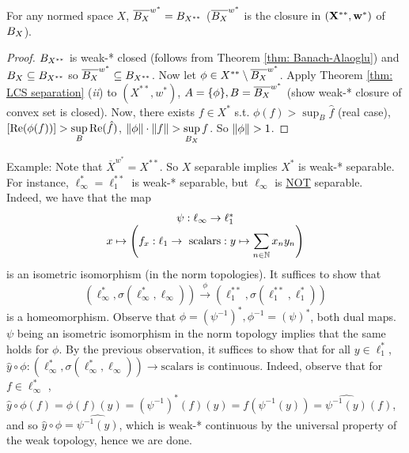 \documentclass{article}
\begin{document}
 \begin{theorem}[Goldstine]\label{thm: Goldstine}
     For any normed space $X$, $\overline{B_{X}}^{w^*}=B_{X^{**}}$ ($\overline{B_{X}}^{w^*}$ is the closure in $(\mathbf{X^{**}, w^*})$ of $B_{X}$).
 \end{theorem}

 \begin{proof}
     $B_{X^{**}}$ is weak-* closed (follows from Theorem \ref{thm: Banach-Alaoglu}) and $B_{X}\subseteq B_{X^{**}}$ so $\overline{B_{X}}^{w^*}\subseteq B_{X^{**}}$. Now let $\phi \in X^{**}\setminus \overline{B_{X}}^{w^*}$. Apply Theorem \ref{thm: LCS separation} (\textit{ii}) to $(X^{**}, w^*)$, $A=\{\phi\}, B = \overline{B_{X}}^{w^*}$ (show weak-* closure of convex set is closed). Now, there exists $f\in X^*$ s.t. $\phi(f)>\displaystyle\sup_B \hat{f}$ (real case), $[\operatorname{Re}(\phi(f))]>\displaystyle\sup_B \operatorname{Re}(\hat{f})$, $\left\lVert\phi\right\rVert\cdot\left\lVert f\right\rVert>\displaystyle\sup_{B_{X}} f$. So $\left\lVert\phi\right\rVert>1$.
 \end{proof}

\begin{examplesblock}{Example:}\label{examples: 10}
    Note that $\overline{X}^{w^*}=X^{**}$. So $X$ separable implies $X^*$ is weak-* separable. For instance, $\ell_\infty^* = \ell_1^{**}$ is weak-* separable, but $\ell_\infty$ is \noindent\underline{NOT} separable.\\

    Indeed, we have that the map 
    $$
    \begin{array}{cc}
         \psi: \ell_\infty\to \ell_1^* \\
          x\mapsto \left(f_x:\ell_1\to \text{ scalars}: y\mapsto \displaystyle\sum_{n\in\mathbb{N}}x_ny_n\right)
    \end{array}
    $$
    is an isometric isomorphism (in the norm topologies). It suffices to show that 
    $$
    (\ell_\infty^*, \sigma(\ell_\infty^*, \ell_\infty))\xrightarrow{\phi}(\ell_1^{**}, \sigma(\ell_1^{**}, \ell_1^{*}))
    $$
    is a homeomorphism. Observe that $\phi = (\psi^{-1})^*, \phi^{-1} = (\psi)^*$, both dual maps. $\psi$ being an isometric isomorphism in the norm topology implies that the same holds for $\phi$. By the previous observation, it suffices to show that for all $y\in \ell_1^{*}$, $\hat{y}\circ \phi: (\ell_\infty^*, \sigma(\ell_\infty^*, \ell_\infty))\to \text {scalars}$ is continuous. Indeed, observe that for $f\in \ell_\infty^*$ , $\hat{y}\circ \phi (f) = \phi(f)(y) = (\psi^{-1})^*(f)(y)=f(\psi^{-1}(y))=\widehat{\psi^{-1}(y)}(f)$, and so $\hat{y}\circ \phi = \widehat{\psi^{-1}(y)}$, which is weak-* continuous by the universal property of the weak topology, hence we are done. 

\end{examplesblock}
\end{document}
